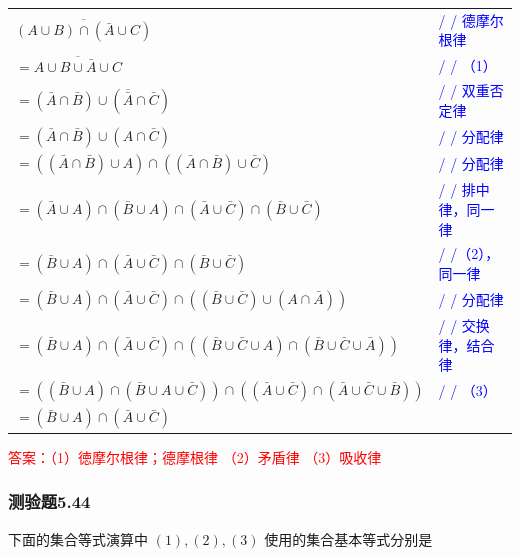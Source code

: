 \documentclass[UTF8, heading=true]{ctexart}
\begin{document}
\begin{table}[htbp]
  \centering
  \renewcommand{\arraystretch}{1.5}
  \begin{tabular}{ll}
    $\overline{(A \cup B) \cap (\bar{A} \cup C)}$ & \textcolor{blue}{/ / 德摩尔根律} \\
    $=\overline{A \cup B \cup \bar{A} \cup C}$ & \textcolor{blue}{/ / （1）} \\
    $=(\bar{A} \cap \bar{B}) \cup (\overline{\bar{A}} \cap \bar{C})$ & \textcolor{blue}{/ / 双重否定律} \\
    $=(\bar{A} \cap \bar{B}) \cup (A \cap \bar{C})$ & \textcolor{blue}{/ / 分配律} \\
    $=((\bar{A} \cap \bar{B}) \cup A) \cap ((\bar{A} \cap \bar{B}) \cup \bar{C})$ & \textcolor{blue}{/ / 分配律} \\
    $=(\bar{A} \cup A) \cap (\bar{B} \cup A) \cap (\bar{A} \cup \bar{C}) \cap (\bar{B} \cup \bar{C})$ & \textcolor{blue}{/ / 排中律，同一律} \\
    $=(\bar{B} \cup A) \cap (\bar{A} \cup \bar{C}) \cap (\bar{B} \cup \bar{C})$ & \textcolor{blue}{/ /（2），同一律} \\
    $=(\bar{B} \cup A) \cap (\bar{A} \cup \bar{C}) \cap ((\bar{B} \cup \bar{C}) \cup (A \cap \bar{A}))$ & \textcolor{blue}{/ / 分配律} \\
    $=(\bar{B} \cup A) \cap (\bar{A} \cup \bar{C}) \cap ((\bar{B} \cup \bar{C} \cup A) \cap (\bar{B} \cup \bar{C} \cup \bar{A}))$ & \textcolor{blue}{/ / 交换律，结合律} \\
    $=((\bar{B} \cup A) \cap (\bar{B} \cup A \cup \bar{C})) \cap ((\bar{A} \cup \bar{C}) \cap (\bar{A} \cup \bar{C} \cup \bar{B}))$ & \textcolor{blue}{/ / （3）} \\
    $=(\bar{B} \cup A) \cap (\bar{A} \cup \bar{C})$ & \\
  \end{tabular}
\end{table}

\textcolor{red}
{
  答案：（1）徳摩尔根律；德摩根律
  （2）矛盾律
  （3）吸收律
}

\subsubsection{测验题5.44}

下面的集合等式演算中 $(1),(2),(3)$ 使用的集合基本等式分别是
\end{document}
